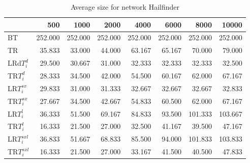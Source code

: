 \begin{table}
\begin{center}
\begin{tabular}{lrrrrrrr}
 & 500 &  1000 & 2000 & 4000 & 6000& 8000&  10000\\\hline
BT & 252.000 & 252.000 & 252.000 & 252.000 & 252.000 & 252.000 & 252.000\\\hline
TR & 35.833 & 33.000 & 44.000 & 63.167 & 65.167 & 70.000 & 79.000\\\hline
LRd$T_i^d$ & 29.500 & 30.667 & 31.000 & 32.333 & 32.333 & 32.333 & 32.500\\\hline
TR$T_i^d$ & 28.333 & 34.500 & 42.000 & 54.500 & 60.167 & 62.000 & 67.167\\\hline
LR$T_i^{sx}$ & 29.833 & 31.000 & 31.333 & 32.667 & 32.667 & 32.667 & 32.833\\\hline
TR$T_i^{sx}$ & 27.667 & 34.500 & 42.667 & 54.833 & 60.500 & 62.000 & 67.167\\\hline
LR$T_i^l$ & 36.333 & 51.500 & 69.167 & 84.833 & 93.500 & 101.333 & 103.667\\\hline
TR$T_i^l$ & 16.333 & 21.500 & 27.000 & 32.500 & 41.167 & 39.500 & 47.167\\\hline
LR$T_i^{sxl}$ & 36.833 & 51.667 & 68.833 & 85.500 & 94.000 & 101.833 & 103.833\\\hline
TR$T_i^{sxl}$ & 16.333 & 21.500 & 27.000 & 33.167 & 41.500 & 40.500 & 47.833\\\hline
\end{tabular}
\end{center}
\caption{Average size for network Hailfinder }
\label{Hailfindersi}
\end{table}


